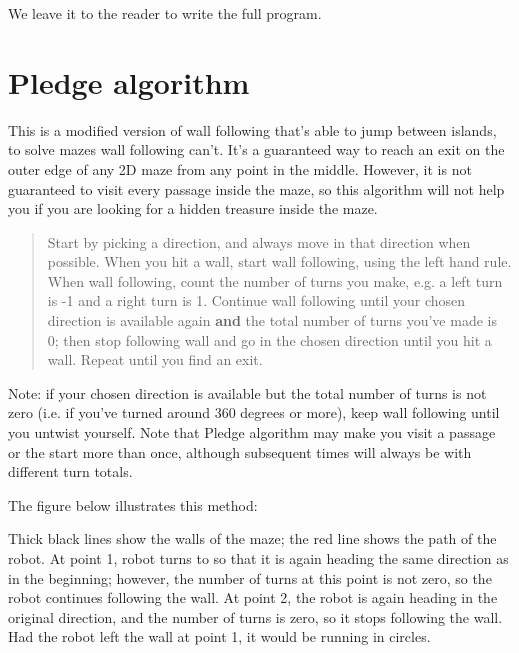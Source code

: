 \documentclass[oneside]{stml-l}
\numberwithin{figure}{chapter}
\begin{document}
We leave it to the reader to write the full program. 
 
 \section{Pledge algorithm}
This is a modified version of wall following that's able to 
jump between islands, to solve mazes wall following can't. 
It's a guaranteed way to reach an exit on the outer edge 
of any 2D maze from any point in the middle.  However, 
it is not guaranteed to visit every passage inside the maze, 
so this algorithm will not help you if you are looking 
for a hidden treasure inside the maze. 

\begin{quote}
Start by picking a direction, and always move in that 
direction when possible. When you  hit a wall, start wall 
following, using the left hand rule.  When wall following, 
count the number of turns you make, e.g. a left turn is -1
 and a right turn is 1. Continue wall following until your 
 chosen direction is available again {\bf and} the total 
 number of turns you've made is 0; then stop following wall 
 and go in the chosen direction until you hit a wall. Repeat 
 until you find an exit. 
\end{quote}

Note: if your chosen direction is available but  the total 
number of turns is not zero (i.e. if you've turned around 360 
degrees or more), keep wall following until you untwist yourself. 
Note that Pledge algorithm may make you visit a passage or the 
start more than once, although subsequent times will always be 
with different turn totals.

The figure below illustrates this method:


Thick black lines show the walls of the maze; the red line shows 
the path of the robot. At point 1, robot turns to so that it is  
again heading the same direction as in the beginning; however, the 
number of turns at this point is not zero, so the robot continues 
following the wall. At point 2, the robot is again heading in the 
original direction, and the number of turns is zero, so it stops 
following the wall. Had the robot left the wall at point 1, it would 
be running in circles.   
\end{document}
